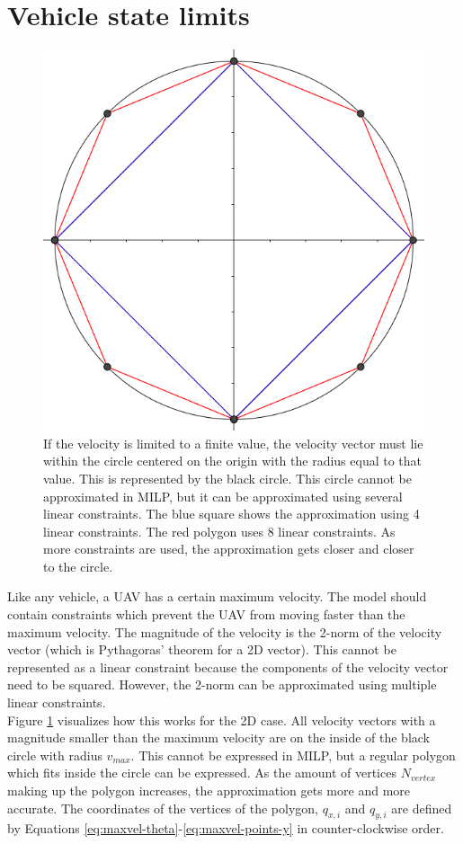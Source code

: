 \section{Vehicle state limits}
\label{subsec:state-limits}
\begin{figure}
    \centering
        \includegraphics[width=0.5\columnwidth]{img/circlelinear}
    \caption{If the velocity is limited to a finite value, the velocity vector must lie within the circle centered on the origin with the radius equal to that value. This is represented by the black circle. This circle cannot be approximated in MILP, but it can be approximated using several linear constraints. The blue square shows the approximation using 4 linear constraints. The red polygon uses 8 linear constraints. As more constraints are used, the approximation gets closer and closer to the circle. }\label{fig:circlelinear}
\end{figure}
Like any vehicle, a UAV has a certain maximum velocity. The model should contain constraints which prevent the UAV from moving faster than the maximum velocity. The magnitude of the velocity is the 2-norm of the velocity vector (which is Pythagoras' theorem for a 2D vector). This cannot be represented as a linear constraint because the components of the velocity vector need to be squared. However, the 2-norm can be approximated using multiple linear constraints. \\
Figure \ref{fig:circlelinear} visualizes how this works for the 2D case. All velocity vectors with a magnitude smaller than the maximum velocity are on the inside of the black circle with radius $v_{max}$. This cannot be expressed in MILP, but a regular polygon which fits inside the circle can be expressed. As the amount of vertices $N_{vertex}$ making up the polygon increases, the approximation gets more and more accurate. The coordinates of the vertices of the polygon, $q_{x,i}$ and $q_{y,i}$ are defined by Equations \ref{eq:maxvel-theta}-\ref{eq:maxvel-points-y} in counter-clockwise order.

